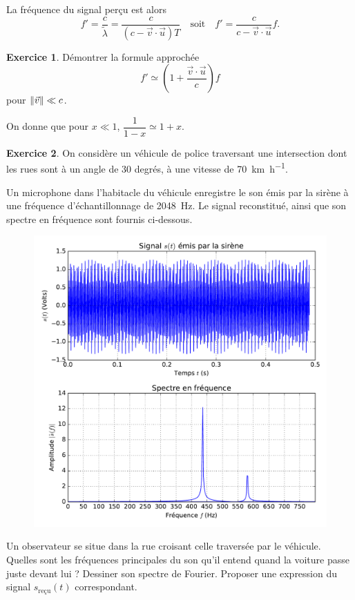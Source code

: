 \documentclass{article}
\DeclarePairedDelimiter{\norm}{\lVert}{\rVert}
\theoremstyle{definition}
\newtheorem{exo}{Exercice}
\begin{document}
La fréquence du signal perçu est alors
\begin{equation}
	f' = \frac{c}{\tilde{\lambda}} = \frac{c}{(c-\vec v \cdot \vec u)T}\quad\text{soit}\quad
	\boxed{f' = \frac{c}{c-\vec v\cdot\vec u}f.}
\end{equation}

\begin{exo}
	Démontrer la formule approchée
	\begin{equation}
		f' \simeq \left(1+\frac{\vec v\cdot \vec u}{c}\right)f
	\end{equation}
	pour $\norm{\vec v}\ll c$.
	
	On donne que pour $x\ll 1$, $\dfrac{1}{1-x}\simeq 1+x$.
\end{exo}

\begin{exo}
	On considère un véhicule de police traversant une intersection dont les rues sont à un angle de 30 degrés, à une vitesse de \SI{70}{\kilo\meter\per\hour}.
	 	
	Un microphone dans l'habitacle du véhicule enregistre le son émis par la sirène à une fréquence d'échantillonnage de \SI{2048}{\hertz}. Le signal reconstitué, ainsi que son spectre en fréquence sont fournis ci-dessous.
	
	\begin{figure}[h]
		\includegraphics[width=\textwidth]{python-scripts/sirene.pdf}
	\end{figure}
	
	Un observateur se situe dans la rue croisant celle traversée par le véhicule. Quelles sont les fréquences principales du son qu'il entend quand la voiture passe juste devant lui ? Dessiner son spectre de Fourier. Proposer une expression du signal $s_\mathrm{reçu}(t)$ correspondant.
\end{exo}
\end{document}
